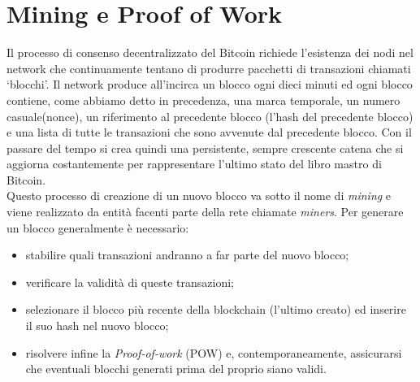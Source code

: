 \section{Mining e Proof of Work}
Il processo di consenso decentralizzato del Bitcoin richiede l'esistenza dei nodi nel network che continuamente tentano di produrre pacchetti di transazioni chiamati \enquote*{blocchi}. Il network produce all'incirca un blocco ogni dieci minuti ed ogni blocco contiene, come abbiamo detto in precedenza, una marca temporale, un numero casuale(nonce), un riferimento al precedente blocco (l'hash del precedente blocco) e una lista di tutte le transazioni che sono avvenute dal precedente blocco. Con il passare del tempo si crea quindi una persistente, sempre crescente catena che si aggiorna costantemente per rappresentare l'ultimo stato del libro mastro di Bitcoin. \\ 
Questo processo di creazione di un nuovo blocco va sotto il nome di \emph{mining} e viene realizzato da entità facenti parte della rete chiamate \emph{miners}. Per generare un blocco generalmente è necessario:
\begin{itemize}
	\item stabilire quali transazioni andranno a far parte del nuovo blocco;
	\item verificare la validità di queste transazioni;
	\item selezionare il blocco più recente della blockchain (l'ultimo creato) ed inserire il suo hash nel nuovo blocco;
	\item risolvere infine la \emph{Proof-of-work} (POW) e, contemporaneamente, assicurarsi che eventuali blocchi generati prima del proprio siano validi.
\end{itemize}
